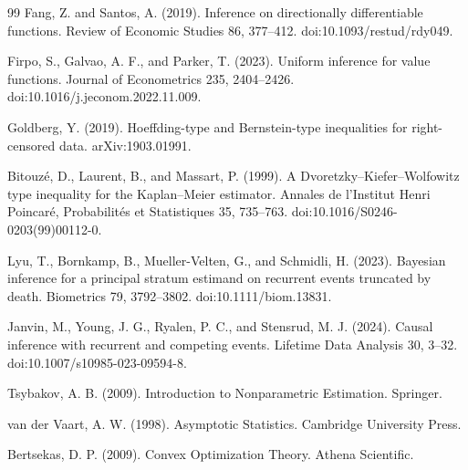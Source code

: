 \documentclass{article}
\begin{document}
\begin{thebibliography}{99}
   Fang, Z. and Santos, A. (2019). Inference on directionally differentiable functions. Review of Economic Studies 86, 377--412. doi:10.1093/restud/rdy049.

   Firpo, S., Galvao, A. F., and Parker, T. (2023). Uniform inference for value functions. Journal of Econometrics 235, 2404--2426. doi:10.1016/j.jeconom.2022.11.009.

   Goldberg, Y. (2019). Hoeffding-type and Bernstein-type inequalities for right-censored data. arXiv:1903.01991.

   Bitouz\'e, D., Laurent, B., and Massart, P. (1999). A Dvoretzky--Kiefer--Wolfowitz type inequality for the Kaplan--Meier estimator. Annales de l'Institut Henri Poincar\'e, Probabilit\'es et Statistiques 35, 735--763. doi:10.1016/S0246-0203(99)00112-0.

   Lyu, T., Bornkamp, B., Mueller-Velten, G., and Schmidli, H. (2023). Bayesian inference for a principal stratum estimand on recurrent events truncated by death. Biometrics 79, 3792--3802. doi:10.1111/biom.13831.

   Janvin, M., Young, J. G., Ryalen, P. C., and Stensrud, M. J. (2024). Causal inference with recurrent and competing events. Lifetime Data Analysis 30, 3--32. doi:10.1007/s10985-023-09594-8.

   Tsybakov, A. B. (2009). Introduction to Nonparametric Estimation. Springer.

   van der Vaart, A. W. (1998). Asymptotic Statistics. Cambridge University Press.

   Bertsekas, D. P. (2009). Convex Optimization Theory. Athena Scientific.

\end{thebibliography}
\end{document}
